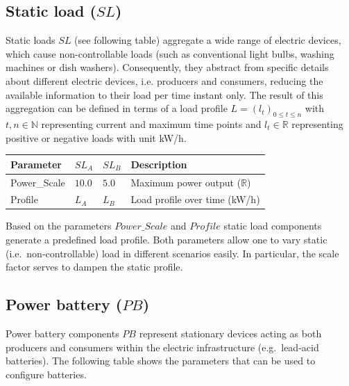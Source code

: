 \subsection{Static load ($SL$)}

Static loads $SL$ (see following table) aggregate a wide range of electric devices, which cause non-controllable loads (such as conventional light bulbs, washing machines or dish washers). Consequently, they abstract from specific details about different electric devices, i.e. producers and consumers, reducing the available information to their load per time instant only. The result of this aggregation can be defined in terms of a load profile $L = (l_t)_{0 \leq t \leq n}$ with $t,n \in \mathbb{N}$ representing current and maximum time points and $l_t \in \mathbb{R}$ representing positive or negative loads with unit kW/h.

\begin{table}[h]
	\renewcommand{\arraystretch}{1.3}
	\centering
	\begin{tabularx}{\columnwidth}{lllX}
		\hline
		\textbf{Parameter}              & \textbf{$SL_{A}$}  & \textbf{$SL_{B}$}   & \textbf{Description} \\ \hline
		Power\_Scale                   	  & $10.0$ & $5.0$ & Maximum power output ($\mathbb{R}$) \\
		Profile                       	  	   & $L_A$ & $L_B$ & Load profile over time  (kW/h)\\ \hline
	\end{tabularx}
\end{table}

Based on the parameters $Power\_Scale$ and $Profile$ static load components generate a predefined load profile. Both parameters allow one to vary static (i.e.\ non-controllable) load in different scenarios easily. In particular, the scale factor serves to dampen the static profile.

\subsection{Power battery ($PB$)}

Power battery components $PB$ represent stationary devices acting as both producers and consumers within the electric infrastructure (e.g.\ lead-acid batteries). The following table shows the parameters that can be used to configure batteries.

